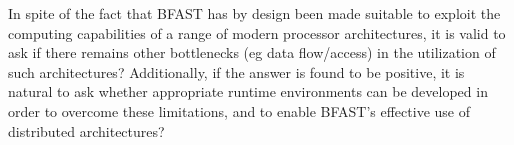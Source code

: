 \documentclass{cpeauth}
\begin{document}
%
% 
%
%
%
%

In spite of the fact that BFAST has by design been made suitable to
exploit the computing capabilities of a range of modern processor
architectures, it is valid to ask if there remains other bottlenecks
(eg data flow/access) in the utilization of such architectures?
Additionally, if the answer is found to be positive, it is natural to
ask whether appropriate runtime environments can be developed in order
to overcome these limitations, and to enable BFAST's effective use of
distributed architectures?
\end{document}
